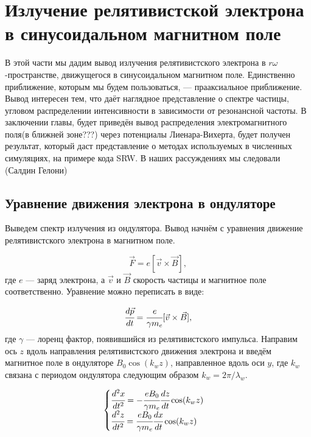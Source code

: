\documentclass[14pt,a4paper]{extarticle}
\numberwithin{equation}{section}
\begin{document}
\section{Излучение релятивистской электрона в синусоидальном магнитном поле}
В этой части мы дадим вывод излучения релятивистского электрона в $r\omega$-пространстве, движущегося в синусоидальном магнитном поле. Единственно приближение, которым мы будем пользоваться, --- прааксиальное приближение. Вывод интересен тем, что даёт наглядное представление о спектре частицы, угловом распределении интенсивности в зависимости от резонансной частоты. В заключении главы, будет приведён вывод распределения электромагнитного поля(в ближней зоне???) через потенциалы Лиенара-Вихерта, будет получен результат, который даст представление о методах используемых в численных симуляциях, на примере кода SRW. В наших рассуждениях мы следовали (Салдин Гелони)
\subsection{Уравнение движения электрона в ондуляторе}
Выведем спектр излучения из ондулятора. Вывод начнём с уравнения движение релятивистского электрона в магнитном поле.

\begin{equation}
	\vec{F} = e[\vec{v} \times \vec{B}],
\end{equation} 
где $e$ --- заряд электрона, а $\vec{v}$ и $\vec{B}$ скорость частицы и магнитное поле соответственно. Уравнение можно переписать в виде:

\begin{equation}
	\cfrac{d\vec{p}}{dt} = \cfrac{e}{\gamma m_e}[\vec{v} \times \vec{B}],
\end{equation}
где $\gamma$ --- лоренц фактор, появившийся из релятивистского импульса. Направим ось $z$ вдоль направления релятивистского движения электрона и введём магнитное поле в ондуляторе $B_0\cos(k_w z)$, направленное вдоль оси $y$, где $k_w$ связана с периодом ондулятора следующим образом $k_w = 2\pi/\lambda_w$. 

\begin{equation}
	\label{eq:eq_of_motion}
	\begin{cases}
		\cfrac{d^2 x}{dt^2} = - \cfrac{e B_0}{\gamma m_e}\cfrac{dz}{dt} \cos(k_w z)\\
		\cfrac{d^2 z}{dt^2} = \cfrac{e B_0}{\gamma m_e}\cfrac{dx}{dt} \cos(k_w z)
	\end{cases} 
\end{equation}
\end{document}
